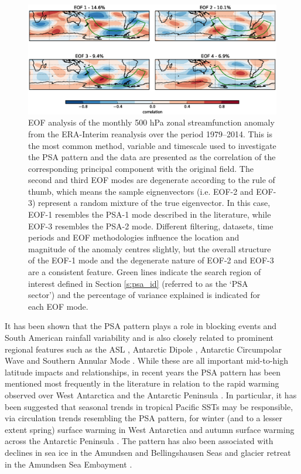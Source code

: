 \begin{figure}
\begin{center}
\includegraphics[width=1\columnwidth]{figures/psa/eof-sf_ERAInterim_500hPa_monthly_native-sh-zonal-anom.eps}
\caption[EOF analysis of the monthly 500 hPa zonal streamfunction anomaly]{\label{fig:eof}
EOF analysis of the monthly 500 hPa zonal streamfunction anomaly from the ERA-Interim reanalysis over the period 1979--2014. This is the most common method, variable and timescale used to investigate the PSA pattern and the data are presented as the correlation of the corresponding principal component with the original field. The second and third EOF modes are degenerate according to the \citet{North1982} rule of thumb, which means the sample eignenvectors (i.e. EOF-2 and EOF-3) represent a random mixture of the true eigenvector. In this case, EOF-1 resembles the PSA-1 mode described in the literature, while EOF-3 resembles the PSA-2 mode. Different filtering, datasets, time periods and EOF methodologies influence the location and magnitude of the anomaly centres slightly, but the overall structure of the EOF-1 mode and the degenerate nature of EOF-2 and EOF-3 are a consistent feature. Green lines indicate the search region of interest defined in Section \ref{s:psa_id} (referred to as the `PSA sector') and the percentage of variance explained is indicated for each EOF mode.%
}
\end{center}
\end{figure}

It has been shown that the PSA pattern plays a role in blocking events \citep{Sinclair1997,Renwick1999} and South American rainfall variability \citep{Mo2001} and is also closely related to prominent regional features such as the ASL \citep{Turner2013}, Antarctic Dipole \citep{Yuan2001}, Antarctic Circumpolar Wave \citep{Christoph1998} and Southern Annular Mode \citep[SAM; e.g.][]{Ding2012}. While these are all important mid-to-high latitude impacts and relationships, in recent years the PSA pattern has been mentioned most frequently in the literature in relation to the rapid warming observed over West Antarctica and the Antarctic Peninsula \citep{Nicolas2014}. In particular, it has been suggested that seasonal trends in tropical Pacific SSTs may be responsible, via circulation trends resembling the PSA pattern, for winter (and to a lesser extent spring) surface warming in West Antarctica \citep{Ding2011} and autumn surface warming across the Antarctic Peninsula \citep{Ding2013}. The pattern has also been associated with declines in sea ice in the Amundsen and Bellingshausen Seas \citep{Schneider2012} and glacier retreat in the Amundsen Sea Embayment \citep{Steig2012}.

